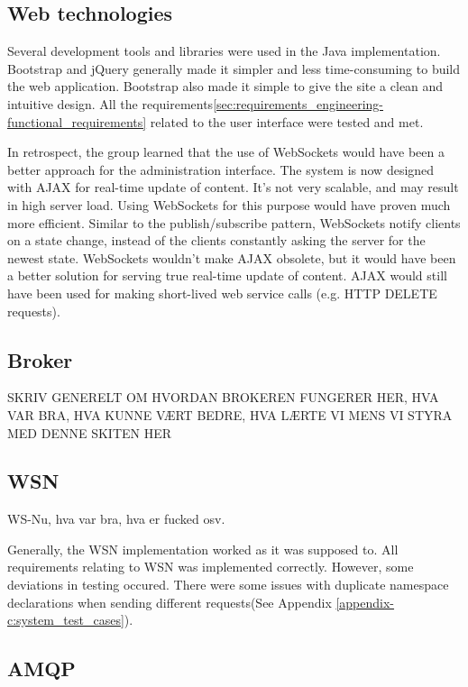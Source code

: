 \subsection{Web technologies}
\label{subsec:Web_technologies}

Several development tools and libraries were used in the Java implementation. Bootstrap and jQuery generally made it simpler and less time-consuming to build the web application. Bootstrap also made it simple to give the site a clean and intuitive design. All the requirements\ref{sec:requirements_engineering-functional_requirements} related to the user interface were tested and met.

In retrospect, the group learned that the use of WebSockets \cite{web-sockets} would have been a better approach for the administration interface. The system is now designed with AJAX for real-time update of content. It's not very scalable, and may result in high server load. Using WebSockets for this purpose would have proven much more efficient. Similar to the publish/subscribe pattern, WebSockets notify clients on a state change, instead of the clients constantly asking the server for the newest state. WebSockets wouldn't make AJAX obsolete, but it would have been a better solution for serving true real-time update of content. AJAX would still have been used for making short-lived web service calls (e.g. HTTP DELETE requests). \\


\subsection{Broker}
\label{subsec:Implementation_broker}
SKRIV GENERELT OM HVORDAN BROKEREN FUNGERER HER, HVA VAR BRA, HVA KUNNE VÆRT BEDRE, HVA LÆRTE VI MENS VI STYRA MED DENNE SKITEN HER

\subsection{WSN}
\label{subsec:evaluation-implementation-wsn}
WS-Nu, hva var bra, hva er fucked osv.

Generally, the WSN implementation worked as it was supposed to. All requirements relating to WSN was implemented correctly. However, some deviations in testing occured. There were some issues with duplicate namespace declarations when sending different requests(See Appendix \ref{appendix-c:system_test_cases}). 

\subsection{AMQP}
\label{subsec:Implementation_AMQP}

